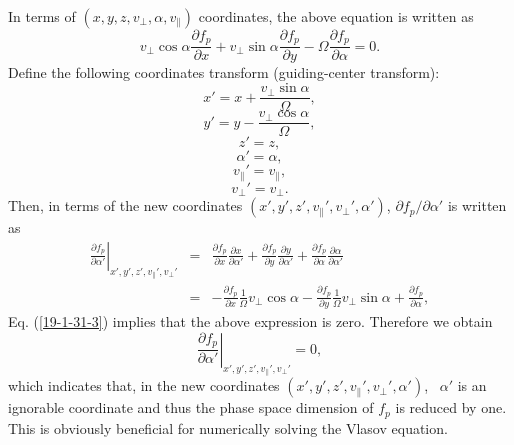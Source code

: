 \documentclass{llncs}
\begin{document}
In terms of $(x, y, z, v_{\perp}, \alpha, v_{\parallel})$ coordinates, the
above equation is written as
\begin{equation}
  \label{19-1-31-3} v_{\perp} \cos \alpha \frac{\partial f_p}{\partial x} +
  v_{\perp} \sin \alpha \frac{\partial f_p}{\partial y} - \Omega
  \frac{\partial f_p}{\partial \alpha} = 0.
\end{equation}
Define the following coordinates transform (guiding-center transform):
\begin{equation}
  x' = x + \frac{v_{\perp} \sin \alpha}{\Omega},
\end{equation}
\begin{equation}
  y' = y - \frac{v_{\perp} \cos \alpha}{\Omega},
\end{equation}
\begin{equation}
  z' = z,
\end{equation}
\begin{equation}
  \alpha' = \alpha,
\end{equation}
\begin{equation}
  v_{\parallel}' = v_{\parallel},
\end{equation}
\begin{equation}
  v_{\perp}' = v_{\perp} .
\end{equation}
Then, in terms of the new coordinates $(x', y', z', v_{\parallel}',
v_{\perp}', \alpha')$, $\partial f_p / \partial \alpha'$ is written as
\begin{eqnarray}
  \left. \frac{\partial f_p}{\partial \alpha'} \right|_{x', y', z',
  v_{\parallel}', v_{\perp}'} & = & \frac{\partial f_p}{\partial x} 
  \frac{\partial x}{\partial \alpha'} + \frac{\partial f_p}{\partial y} 
  \frac{\partial y}{\partial \alpha'} + \frac{\partial f_p}{\partial \alpha} 
  \frac{\partial \alpha}{\partial \alpha'} \nonumber\\
  & = & - \frac{\partial f_p}{\partial x}  \frac{1}{\Omega} v_{\perp} \cos
  \alpha - \frac{\partial f_p}{\partial y}  \frac{1}{\Omega} v_{\perp} \sin
  \alpha + \frac{\partial f_p}{\partial \alpha}, 
\end{eqnarray}
Eq. (\ref{19-1-31-3}) implies that the above expression is zero. Therefore we
obtain
\begin{equation}
  \left. \frac{\partial f_p}{\partial \alpha'} \right|_{x', y', z',
  v_{\parallel}', v_{\perp}'} = 0,
\end{equation}
which indicates that, in the new coordinates $(x', y', z', v_{\parallel}',
v_{\perp}', \alpha')$, \ $\alpha'$ is an ignorable coordinate and thus the
phase space dimension of $f_p$ is reduced by one. This is obviously beneficial
for numerically solving the Vlasov equation.
\end{document}
